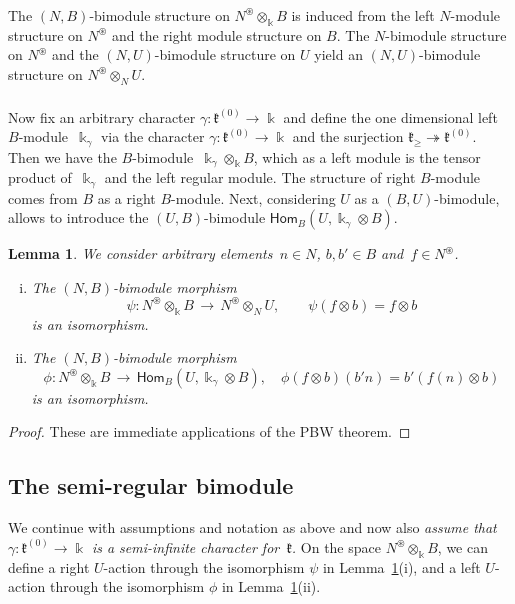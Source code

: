 \documentclass[11pt]{amsart}
\newcommand{\fHom}{{\mathsf{Hom}}}
\newcommand{\tto}{\twoheadrightarrow}
\newcommand{\mk}{\Bbbk}
\newcommand{\fk}{\mathfrak{k}}
\numberwithin{equation}{section}
\theoremstyle{plain}
\newtheorem{lemma}[subsubsection]{Lemma}
\theoremstyle{remark}
\theoremstyle{remark}
\theoremstyle{construction}
\begin{document}
\subsubsection{}
The $(N,B)$-bimodule structure on $N^{\circledast}\otimes_{\mk}B$ is induced from the left $N$-module structure on $N^{\circledast}$ and the right module structure on $B$.
The $N$-bimodule structure on $N^{\circledast}$ and {the} $(N,U)$-bimodule {structure on $U$} yield an $(N,U)$-bimodule structure on $N^{\circledast}\otimes_{N}U$.

\subsubsection{} Now fix an arbitrary character $\gamma:\fk^{(0)}\to\mk$ and define the one dimensional left $B$-module~$\mk_\gamma$ via the character $\gamma:\fk^{(0)}\to \mk$ and the surjection $\fk_{\ge}\tto\fk^{(0)}$.
Then we have the $B$-bimodule~$\mk_\gamma\otimes_{\mk}B$, which as a left module is the tensor product of~$\mk_\gamma$ and the left regular module. The {structure of right $B$-module comes from $B$ as a right $B$-module. Next, considering}
 $U$ as a $(B,U)$-bimodule, allows to introduce the $(U,B)$-bimodule
$\fHom_B(U,\mk_\gamma\otimes B)$.



\begin{lemma}\label{LemLR}We consider arbitrary elements~$n\in N$, $b,b'\in B$ and~$f\in N^{\circledast}$.
\begin{enumerate}[(i)]
\item The $(N,B)$-bimodule morphism
$$\psi:N^{\circledast}\otimes_{\mk}B\,\to\,N^{\circledast}\otimes_{N}U,\qquad\psi(f\otimes b)=f\otimes b $$ is an isomorphism. 
\item
The $(N,B)$-bimodule morphism
$$\phi:N^{\circledast}\otimes_{\mk}B\,\to\, \fHom_{B}(U,\mk_\gamma\otimes B),\quad\phi(f\otimes b)(b'n)=b'(f(n)\otimes b)$$ 
is an isomorphism. \end{enumerate}\end{lemma}
\begin{proof}
These are immediate applications of the PBW theorem. 
\end{proof}

\subsection{The semi-regular bimodule}
We continue with assumptions and notation as above and now also {\em assume that~$\gamma:\fk^{(0)}\to\mk$ is a semi-infinite character for~$\fk$.} On the space $N^{\circledast}\otimes_{\mk}B$, we can define a right $U$-action through the isomorphism $\psi$ in Lemma~\ref{LemLR}(i){,} and a left $U$-action through the isomorphism $\phi$ in Lemma~\ref{LemLR}(ii).
\end{document}
